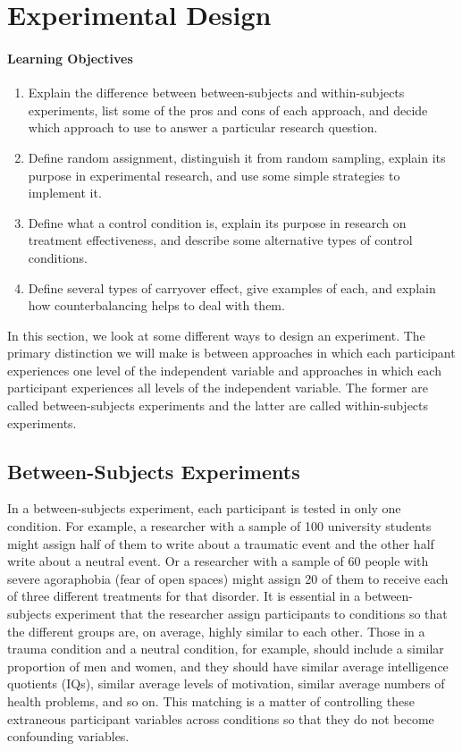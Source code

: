 \newpage
\section{Experimental Design}


  \paragraph{Learning Objectives}
  \begin{enumerate}
  \item Explain the difference between between-subjects and within-subjects experiments, list some of the pros and cons of each approach, and decide which approach to use to answer a particular research question.
  \item Define random assignment, distinguish it from random sampling, explain its purpose in experimental research, and use some simple strategies to implement it.
  \item Define what a control condition is, explain its purpose in research on treatment effectiveness, and describe some alternative types of control conditions.
  \item Define several types of carryover effect, give examples of each, and explain how counterbalancing helps to deal with them.
   \end{enumerate}



In this section, we look at some different ways to design an experiment. The primary distinction we will make is between approaches in which each participant experiences one level of the independent variable and approaches in which each participant experiences all levels of the independent variable. The former are called between-subjects experiments and the latter are called within-subjects experiments.

\subsection{Between-Subjects Experiments}

In a between-subjects experiment, each participant is tested in only one condition. For example, a researcher with a sample of 100 university students might assign half of them to write about a traumatic event and the other half write about a neutral event. Or a researcher with a sample of 60 people with severe agoraphobia (fear of open spaces) might assign 20 of them to receive each of three different treatments for that disorder. It is essential in a between- subjects experiment that the researcher assign participants to conditions so that the different groups are, on average, highly similar to each other. Those in a trauma condition and a neutral condition, for example, should include a similar proportion of men and women, and they should have similar average intelligence quotients (IQs), similar average levels of motivation, similar average numbers of health problems, and so on. This matching is a matter of controlling these extraneous participant variables across conditions so that they do not become confounding variables.


